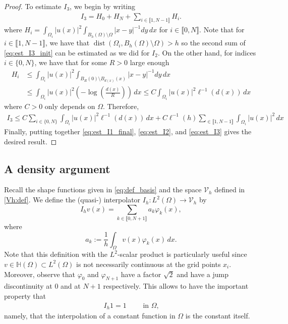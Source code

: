 \documentclass[10 pt]{article}
\newcommand\inter[1]{\llbracket #1\rrbracket}
\numberwithin{equation}{section}
\def\dist{\operatorname{dist}}
\begin{document}
\begin{proof}
To estimate $I_3$, we begin by writing
%
\begin{align}\label{eq:est_I3_init}
    I_3=H_0+H_N+\sum_{i\in\inter{1,N-1}}H_i.
\end{align}
%
where $H_i=\int_{\Omega_i}|u(x)|^2\int_{B_h(\Omega)\setminus \Omega}|x-y|^{-1}dy\,dx$ for $i\in\inter{0,N}$. Note that for $i\in\inter{1,N-1}$, we have that $\dist(\Omega_i,B_h(\Omega)\setminus\Omega)>h$ so the second sum of \eqref{eq:est_I3_init} can be estimated as we did for $I_2$. On the other hand, for indices $i\in\{0,N\}$, we have that for some $R>0$ large enough
%
\begin{align*}
    H_i&\leq \int_{\Omega_i}|u(x)|^2\int_{B_R(0)\setminus B_{d(x)}(x)}|x-y|^{-1}dy\,dx \\
    &\leq \int_{\Omega_i}|u(x)|^2\left(-\log\left(\tfrac{d(x)}{R}\right)\right)\,dx \leq C \int_{\Omega_i}|u(x)|^2\ell^{-1}(d(x))\,dx
\end{align*}
%
where $C>0$ only depends on $\Omega$. Therefore,
%
\begin{align}\label{eq:est_I3}
    I_3\leq C \sum_{i\in\{0,N\}}\int_{\Omega_i}|u(x)|^2\ell^{-1}(d(x))\,dx + C\ell^{-1}(h)\sum_{\in\inter{1,N-1}}\int_{\Omega_i}|u(x)|^2\,dx
\end{align}
%
Finally, putting together \eqref{eq:est_I1_final}, \eqref{eq:est_I2}, and \eqref{eq:est_I3} gives the desired result. 
%
\end{proof}

\subsection{A density argument}


Recall the shape functions given in \eqref{eq:def_basis} and the space $\mathcal V_h$ defined in \eqref{Vh:def}. We define the (quasi-) interpolator $I_h:L^2(\Omega)\to \mathcal V_h$ by
%
\begin{equation}\label{eq:interpolator}
I_h v(x)=\sum_{k\in\inter{0,N+1}}a_k \varphi_k(x),
\end{equation}
where
%
\begin{equation}\label{eq:def_coeff_ak}
  a_k:=\frac{1}{h}\int_{\Omega}v(x)\varphi_k(x)\,dx.
\end{equation}
%
Note that this definition with the $L^2$-scalar product is particularly useful since $v\in\mathbb H(\Omega)\subset L^2(\Omega)$ is not necessarily continuous at the grid points $x_i$.  Moreover, observe that $\varphi_0$ and $\varphi_{N+1}$ have a factor $\sqrt{2}$ and have a jump discontinuity at $0$ and at $N+1$ respectively.  This allows to have the important property that
\begin{align}\label{Ihc}
I_h 1 = 1\qquad \text{ in $\Omega$,}
\end{align}
namely, that the interpolation of a constant function in $\Omega$ is the constant itself.
\end{document}
